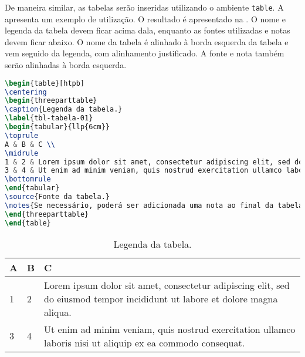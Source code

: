 \documentclass[portuguese]{textolivre}
\begin{document}
\lipsum[12]

De maneira similar, as tabelas serão inseridas utilizando o ambiente \verb|table|.
A  apresenta um exemplo de utilização. O resultado é apresentado na
. O nome e legenda da tabela devem ficar acima dala, enquanto
as fontes utilizadas e notas devem ficar abaixo. 
O nome da tabela é alinhado à borda esquerda da tabela e vem
seguido da legenda, com alinhamento justificado. A fonte e nota também
serão alinhadas à borda esquerda.
\begin{lstlisting}[language=tex, label=lst-table, caption={Inserindo uma tabela.}]
\begin{table}[htpb]
\centering
\begin{threeparttable}
\caption{Legenda da tabela.}
\label{tbl-tabela-01}
\begin{tabular}{llp{6cm}}
\toprule 
A & B & C \\ 
\midrule
1 & 2 & Lorem ipsum dolor sit amet, consectetur adipiscing elit, sed do eiusmod tempor incididunt ut labore et dolore magna aliqua. \\ 
3 & 4 & Ut enim ad minim veniam, quis nostrud exercitation ullamco laboris nisi ut aliquip ex ea commodo consequat. \\ 
\bottomrule
\end{tabular}
\source{Fonte da tabela.}
\notes{Se necessário, poderá ser adicionada uma nota ao final da tabela.}
\end{threeparttable}
\end{table}
\end{lstlisting} %

\begin{table}[htpb]
\centering
\begin{threeparttable}
\caption{Legenda da tabela.}
\label{tbl-tabela-0}
\begin{tabular}{llp{6cm}}
\toprule 
A & B & C \\ 
\midrule
1 & 2 & Lorem ipsum dolor sit amet, consectetur adipiscing elit, sed do eiusmod tempor incididunt ut labore et dolore magna aliqua. \\ 
3 & 4 & Ut enim ad minim veniam, quis nostrud exercitation ullamco laboris nisi ut aliquip ex ea commodo consequat. \\ 
\bottomrule
\end{tabular}
\end{threeparttable}
\end{table}
\end{document}
